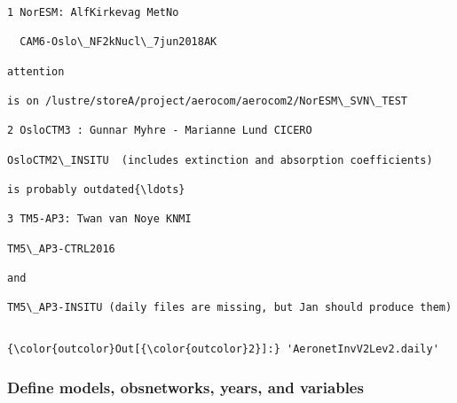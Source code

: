 \documentclass[11pt]{article}
\begin{document}
    \begin{Verbatim}[commandchars=\\\{\}]
1 NorESM: AlfKirkevag MetNo

  CAM6-Oslo\_NF2kNucl\_7jun2018AK

attention

is on /lustre/storeA/project/aerocom/aerocom2/NorESM\_SVN\_TEST

2 OsloCTM3 : Gunnar Myhre - Marianne Lund CICERO

OsloCTM2\_INSITU  (includes extinction and absorption coefficients)

is probably outdated{\ldots}

3 TM5-AP3: Twan van Noye KNMI

TM5\_AP3-CTRL2016

and

TM5\_AP3-INSITU (daily files are missing, but Jan should produce them)


    \end{Verbatim}

\begin{Verbatim}[commandchars=\\\{\}]
{\color{outcolor}Out[{\color{outcolor}2}]:} 'AeronetInvV2Lev2.daily'
\end{Verbatim}
            
    \hypertarget{define-models-obsnetworks-years-and-variables}{%
\subsubsection{Define models, obsnetworks, years, and
variables}\label{define-models-obsnetworks-years-and-variables}}
\end{document}
